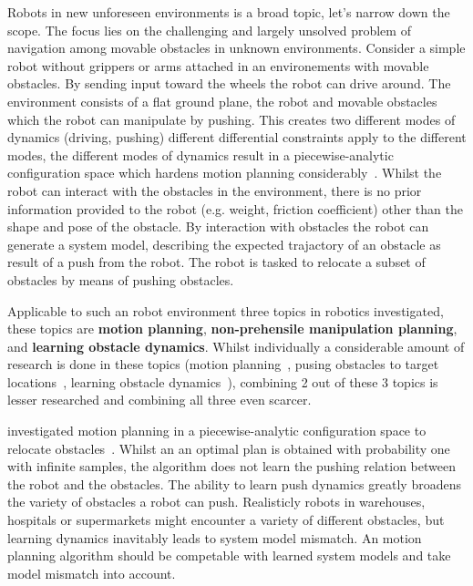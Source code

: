 Robots in new unforeseen environments is a broad topic, let's narrow down the scope. The focus lies on the challenging and largely unsolved problem of navigation among movable obstacles in unknown environments. Consider a simple robot without grippers or arms attached in an environements with movable obstacles. By sending input toward the wheels the robot can drive around. The environment consists of a flat ground plane, the robot and movable obstacles which the robot can manipulate by pushing. This creates two different modes of dynamics (driving, pushing) different differential constraints apply to the different modes, the different modes of dynamics result in a piecewise-analytic configuration space which hardens motion planning considerably~\cite{vega-brown_asymptotically_2020}. Whilst the robot can interact with the obstacles in the environment, there is no prior information provided to the robot (e.g. weight, friction coefficient) other than the shape and pose of the obstacle. By interaction with obstacles the robot can generate a system model, describing the expected trajactory of an obstacle as result of a push from the robot. The robot is tasked to relocate a subset of obstacles by means of pushing obstacles. \bs

Applicable to such an robot environment three topics in robotics investigated, these topics are \textbf{motion planning}, \textbf{non-prehensile manipulation planning}, and \textbf{learning obstacle dynamics}. Whilst individually a considerable amount of research is done in these topics (motion planning~\cite{lavalle_planning_2006,elbanhawi_samplingbased_2014,kingston_samplingbased_2018,chen_fast_2018}, pusing obstacles to target locations~\cite{arruda_uncertainty_2017,mericli_pushmanipulation_2015,toussaint_sequenceofconstraints_2022,stuber_let_2020,stuber_featurebased_2018,bauza_dataefficient_2018}, learning obstacle dynamics~\cite{seegmiller_vehicle_2013,cong_selfadapting_2020}), combining 2 out of these 3 topics is lesser researched and combining all three even scarcer.\bs

\citeauthor{vega-brown_asymptotically_2020} investigated motion planning in a piecewise-analytic configuration space to relocate obstacles~\cite{vega-brown_asymptotically_2020}. Whilst an an optimal plan is obtained with probability one with infinite samples, the algorithm does not learn the pushing relation between the robot and the obstacles. The ability to learn push dynamics greatly broadens the variety of obstacles a robot can push. Realisticly robots in warehouses, hospitals or supermarkets might encounter a variety of different obstacles, but learning dynamics inavitably leads to system model mismatch. An motion planning algorithm should be competable with learned system models and take model mismatch into account.\bs

